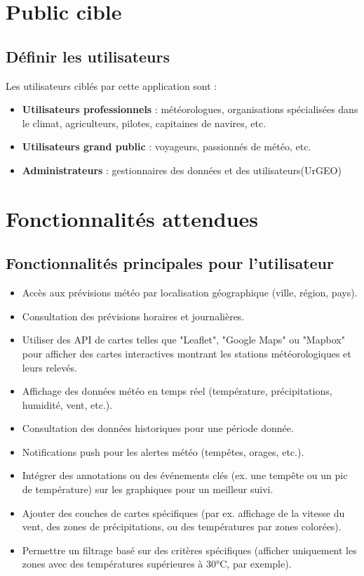 \documentclass[a4paper,12pt]{article}
\begin{document}
\section{Public cible}
\subsection{Définir les utilisateurs}
Les utilisateurs ciblés par cette application sont :
\begin{itemize}
    \item \textbf{Utilisateurs professionnels} : météorologues, organisations spécialisées dans le climat, agriculteurs, pilotes, capitaines de navires, etc.
    \item \textbf{Utilisateurs grand public} : voyageurs, passionnés de météo, etc.
    \item \textbf{Administrateurs} : gestionnaires des données et des utilisateurs(UrGEO)
\end{itemize}

\section{Fonctionnalités attendues}
\subsection{Fonctionnalités principales pour l'utilisateur}
\begin{itemize}
    \item Accès aux prévisions météo par localisation géographique (ville, région, pays).
    \item Consultation des prévisions horaires et journalières.
    \item Utiliser des API de cartes telles que "Leaflet", "Google Maps" ou "Mapbox" pour afficher des cartes interactives montrant les stations météorologiques et leurs relevés.
    \item Affichage des données météo en temps réel (température, précipitations, humidité, vent, etc.).
    \item Consultation des données historiques pour une période donnée.
    \item Notifications push pour les alertes météo (tempêtes, orages, etc.).
     \item Intégrer des annotations ou des événements clés (ex. une tempête ou un pic de température) sur les graphiques pour un meilleur suivi.
\item Ajouter des couches de cartes spécifiques (par ex. affichage de la vitesse du vent, des zones de précipitations, ou des températures par zones colorées).
\item Permettre un filtrage basé sur des critères spécifiques (afficher uniquement les zones avec des températures supérieures à 30°C, par exemple).

\end{itemize}
\end{document}
